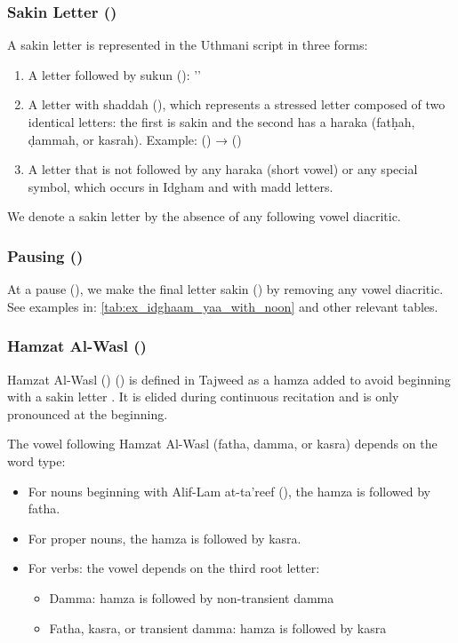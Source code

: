 \subsubsection{Sakin Letter ()}

A sakin letter is represented in the Uthmani script in three forms:

\begin{enumerate}
\item A letter followed by sukun (): ''
\item A letter with shaddah (), which represents a stressed letter composed of two identical letters: the first is sakin and the second has a haraka (fatḥah, ḍammah, or kasrah). Example: () → ()
\item A letter that is not followed by any haraka (short vowel) or any special symbol, which occurs in Idgham and with madd letters.
\end{enumerate}

We denote a sakin letter by the absence of any following vowel diacritic.

\subsubsection{Pausing ()}

At a pause (), we make the final letter sakin () by removing any vowel diacritic. See examples in: \ref{tab:ex_idghaam_yaa_with_noon} and other relevant tables.




\subsubsection{Hamzat Al-Wasl ()}

Hamzat Al-Wasl () () is defined in Tajweed as a hamza added to avoid beginning with a sakin letter \cite{sweed2021}. It is elided during continuous recitation and is only pronounced at the beginning.

The vowel following Hamzat Al-Wasl (fatha, damma, or kasra) depends on the word type:

\begin{itemize}
\item For nouns beginning with Alif-Lam at-ta'reef (), the hamza is followed by fatha.
\item For proper nouns, the hamza is followed by kasra.
\item For verbs: the vowel depends on the third root letter:
\begin{itemize}
    \item Damma: hamza is followed by non-transient damma
    \item Fatha, kasra, or transient damma: hamza is followed by kasra
\end{itemize}
\end{itemize}

